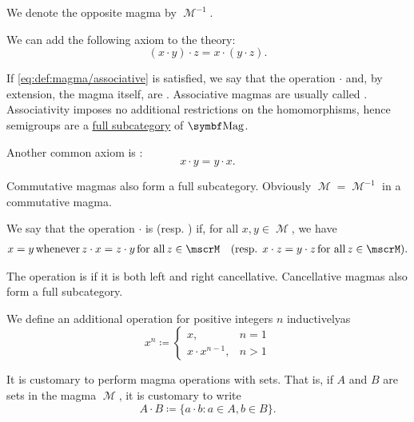 \begin{definition}
\begin{DefEnum}
    We denote the opposite magma by \( \mscrM^{-1} \).

     We can add the following axiom to the theory:
    \begin{equation}\label{eq:def:magma/associative}
      (x \cdot y) \cdot z = x \cdot (y \cdot z).
    \end{equation}

    If \eqref{eq:def:magma/associative} is satisfied, we say that the operation \( \cdot \) and, by extension, the magma itself, are . Associative magmas are usually called . Associativity imposes no additional restrictions on the homomorphisms, hence semigroups are a \hyperref[def:subcategory]{full subcategory} of \( \Cat{Mag} \).

     Another common axiom is :
    \begin{equation}\label{eq:def:magma/commutative}
      x \cdot y = y \cdot x.
    \end{equation}

    Commutative magmas also form a full subcategory. Obviously \( \mscrM = \mscrM^{-1} \) in a commutative magma.

     We say that the operation \( \cdot \) is  (resp. ) if, for all \( x, y \in \mscrM \), we have
    \begin{align}\label{eq:def:magma/cancellative}
      x = y \T{whenever} z \cdot x = z \cdot y \T{for all} z \in \mscrM
      &&
      (\text{resp. } x \cdot z = y \cdot z \T{for all} z \in \mscrM).
    \end{align}

    The operation is  if it is both left and right cancellative. Cancellative magmas also form a full subcategory.

     We define an additional  operation for positive integers \( n \) inductively\IND as
    \begin{equation}\label{eq:def:magma/exponentiation}
      x^n \coloneqq \begin{cases}
        x,               & n = 1 \\
        x \cdot x^{n-1}, & n > 1
      \end{cases}
    \end{equation}

     It is customary to perform magma operations with sets. That is, if \( A \) and \( B \) are sets in the magma \( \mscrM \), it is customary to write
    \begin{equation*}
      A \cdot B \coloneqq \{ a \cdot b \colon a \in A, b \in B \}.
    \end{equation*}


\end{DefEnum}
\end{definition}
